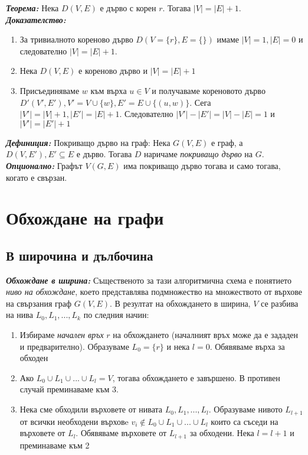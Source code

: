 \documentclass[11pt]{article} %
\newcommand{\italicBold}[1]{\textbf{\emph{#1}}}
\newcommand{\definition}{\italicBold{Дефиниция: }}
\newcommand{\theorem}{\italicBold{Теорема: }}
\newcommand{\proof}{\italicBold{Доказателство: }}
\newcommand{\curlies}[1]{\{#1\}}
\newcommand{\enumNum}{\renewcommand{\theenumi}{\arabic{enumi}}}
\newcommand{\enumlet}{\renewcommand{\theenumi}{\alph{enumi}}}
\begin{document}
\theorem Нека $D(V, E)$ е дърво с корен $r$. Тогава $|V|= |E| + 1$. \\
\proof \\

\enumlet
\begin{enumerate}
	\item За тривиалното кореново дърво $D(V = \curlies{r}, E = \curlies{})$ имаме $|V| = 1, |E| = 0$ и следователно $|V| = |E| + 1$.\\
	\item Нека $D(V, E)$ е кореново дърво и $|V| = |E|+1$\\
	\item Присъединяваме $w$ към върха $u \in V$ и получаваме кореновото дърво $D'(V', E'), V' = V \cup \curlies{w}, E' = E \cup \curlies{(u, w)}$. Сега $|V'| = |V| + 1, |E'| = |E| + 1$. Следователно $|V'| - |E'| = |V| - |E| = 1$ и $|V'| = |E'| + 1$ \\
\end{enumerate} \par

\definition Покриващо дърво на граф: Нека $G(V, E)$ е граф, а \\$D(V, E'), E' \subseteq E$ е дърво. Тогава $D$ наричаме \textit{покриващо дърво} на $G$. \\
\italicBold{Опционално:} Графът $V(G, E)$ има покриващо дърво тогава и само тогава, когато е свързан. 

\section{Обхождане на графи}

\subsection{В широчина и дълбочина}

\italicBold{Обхождане в ширина:} Същественото за тази алгоритмична схема е понятието \textit{ниво на обхождане}, което представлява подмножество на множеството от върхове на свързания граф $G(V, E)$. В резултат на обхождането в ширина, $V$ се разбива на нива $L_{0}, L_{1}, ..., L_{k}$ по следния начин:

\enumNum
\begin{enumerate}
	\item Избираме \textit{начален връх} $r$ на обхождането (началният връх може да е зададен и предварително). Образуваме $L_{0} = \curlies{r}$ и нека $l = 0$. Обявяваме върха за обходен \\
	\item Ако $L_{0} \cup L_{1} \cup ... \cup L_{l} = V$, тогава обхождането е завършено. В противен случай преминаваме към 3. \\
	\item Нека сме обходили върховете от нивата $L_{0}, L_{1}, ..., L_{l}$. Образуваме нивото $L_{l+1}$ от всички необходени върховe $v_{i} \not\in L_{0} \cup L_{1} \cup ... \cup L_{l}$ които са съседи на върховете от $L_{l}$. Обявяваме върховете от $L_{l+1}$ за обходени. Нека $l = l+1$ и преминаваме към 2 
\end{enumerate} \par
\end{document}
